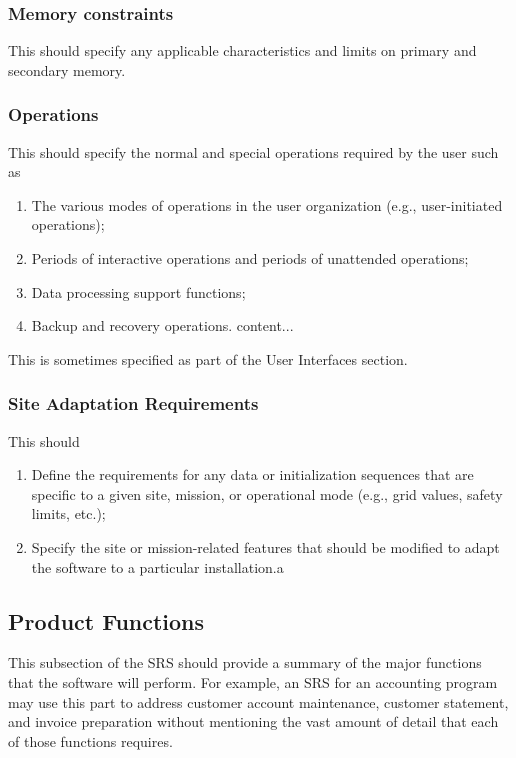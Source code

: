 \documentclass[draftclsnofoot,onecolumn,10pt]{IEEEtran}
\begin{document}
\subsubsection{Memory constraints}
This should specify any applicable characteristics and limits on primary and
secondary memory.

\subsubsection{Operations}
This should specify the normal and special operations required by the user such as
\begin{enumerate}
	\item The various modes of operations in the user organization (e.g.,
		user-initiated operations);
	\item Periods of interactive operations and periods of unattended operations;
	\item Data processing support functions;
	\item Backup and recovery operations.	content...
\end{enumerate}

This is sometimes specified as part of the User Interfaces section.

\subsubsection{Site Adaptation Requirements}
This should
\begin{enumerate}
	\item Define the requirements for any data or initialization sequences that
		are specific to a given site, mission, or operational mode (e.g., grid
		values, safety limits, etc.);
	\item Specify the site or mission-related features that should be modified
		to adapt the software to a particular installation.a
\end{enumerate}

\subsection{Product Functions}
This subsection of the SRS should provide a summary of the major functions that
the software will perform. For example, an SRS for an accounting program may use
this part to address customer account maintenance, customer statement, and
invoice preparation without mentioning the vast amount of detail that each of
those functions requires.\par
\end{document}
